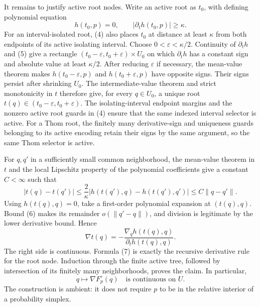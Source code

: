 It remains to justify active root nodes.  Write an active root as \(t_0\), with defining polynomial equation
\[
 h(t_0,p)=0,
 \qquad
 |\partial_t h(t_0,p)|\geq\kappa. \tag{5}
\]
For an interval-isolated root, (4) also places \(t_0\) at distance at least \(\kappa\) from both endpoints of its active isolating interval.  Choose \(0<\varepsilon<\kappa/2\).  Continuity of \(\partial_t h\) and (5) give a rectangle \((t_0-\varepsilon,t_0+\varepsilon)\times U_0\) on which \(\partial_t h\) has a constant sign and absolute value at least \(\kappa/2\).  After reducing \(\varepsilon\) if necessary, the mean-value theorem makes \(h(t_0-\varepsilon,p)\) and \(h(t_0+\varepsilon,p)\) have opposite signs.  Their signs persist after shrinking \(U_0\).  The intermediate-value theorem and strict monotonicity in \(t\) therefore give, for every \(q\in U_0\), a unique root \(t(q)\in(t_0-\varepsilon,t_0+\varepsilon)\).  The isolating-interval endpoint margins and the nonzero active root guards in (4) ensure that the same indexed interval selector is active.  For a Thom root, the finitely many derivative-sign and uniqueness guards belonging to its active encoding retain their signs by the same argument, so the same Thom selector is active.

For \(q,q'\) in a sufficiently small common neighborhood, the mean-value theorem in \(t\) and the local Lipschitz property of the polynomial coefficients give a constant \(C<\infty\) such that
\[
 |t(q)-t(q')|
 \leq \frac{2}{\kappa}
       |h(t(q'),q)-h(t(q'),q')|
 \leq C\lVert q-q'\rVert. \tag{6}
\]
Using \(h(t(q),q)=0\), take a first-order polynomial expansion at \((t(q),q)\).  Bound (6) makes its remainder \(o(\lVert q'-q\rVert)\), and division is legitimate by the lower derivative bound.  Hence
\[
 \nabla t(q)
 =-\frac{\nabla_q h(t(q),q)}{\partial_t h(t(q),q)}. \tag{7}
\]
The right side is continuous.  Formula (7) is exactly the recursive derivative rule for the root node.  Induction through the finite active tree, followed by intersection of its finitely many neighborhoods, proves the claim.  In particular,
\[
 q\longmapsto\nabla F_p^{\circ}(q)
 \quad\text{is continuous on }U. \tag{8}
\]
The construction is ambient: it does not require \(p\) to be in the relative interior of a probability simplex.

